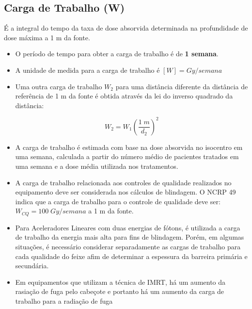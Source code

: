 \documentclass[11pt,a4paper]{article}
\begin{document}
        \subsection*{\textcolor{CarnationPink}{Carga de Trabalho (W)}}

            É a integral do tempo da taxa de dose absorvida determinada na profundidade de dose máxima a 1 m da fonte. 

            \begin{itemize}
                \item O período de tempo para obter a carga de trabalho é de \textbf{1 semana}.
                \item A unidade de medida para a carga de trabalho é $[W] = Gy/semana$
                \item Uma outra carga de trabalho $W_2$ para uma distância diferente da distância de referência de 1 m da fonte é obtida através da lei do inverso quadrado da distância:
                
                    \begin{equation}
                        W_2 = W_1 \left(\frac{1 \; m}{d_2}\right)^2
                    \end{equation}

                \item A carga de trabalho é estimada com base na dose absorvida no isocentro em uma semana, calculada a partir do número médio de pacientes tratados em uma semana e a dose média utilizada nos tratamentos. 
                \item A carga de trabalho relacionada aos controles de qualidade realizados no equipamento deve ser considerada nos cálculos de blindagem. O NCRP 49 indica que a carga de trabalho para o controle de qualidade deve ser: $W_{CQ} = 100 \; Gy/semana$ a 1 m da fonte.
                \item Para Aceleradores Lineares com duas energias de fótons, é utilizada a carga de trabalho da energia mais alta para fins de blindagem. Porém, em algumas situações, é necessário considerar separadamente as cargas de trabalho para cada qualidade do feixe afim de determinar a espessura da barreira primária e secundária.
                \item Em equipamentos que utilizam a técnica de IMRT, há um aumento da rasiação de fuga pelo cabeçote e portanto há um aumento da carga de trabalho para a radiação de fuga
            \end{itemize}
\end{document}

